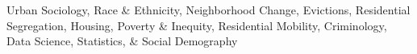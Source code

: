 

\begin{cvparagraph}

Urban Sociology, Race \& Ethnicity, Neighborhood Change, Evictions, Residential Segregation, Housing, Poverty \& Inequity, Residential Mobility, Criminology, Data Science, Statistics, \& Social Demography\newline
\end{cvparagraph}

